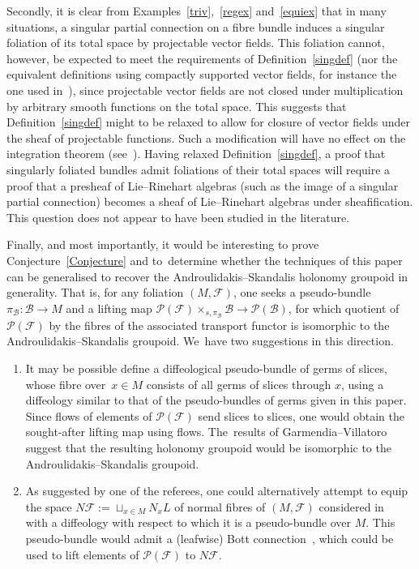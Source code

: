\documentclass[pdftex]{sigma}
\numberwithin{equation}{section}
\def\FF{{\mathcal{F}}}
\def\BB{{\mathcal{B}}}
\def\PP{{\mathcal{P}}}
\begin{document}
Secondly, it is clear from Examples~\ref{triv},~\ref{regex} and~\ref{equiex} that in many situations, a singular partial connection on a fibre bundle induces a singular foliation of its total space by projectable vector fields. This foliation cannot, however, be expected to meet the requirements of Definition~\ref{singdef} (nor the equivalent definitions using compactly supported vector fields, for instance the one used in~\cite{iakovos2}), since projectable vector fields are not closed under multiplication by arbitrary smooth functions on the total space. This suggests that Definition~\ref{singdef} might to be relaxed to allow for closure of vector fields under the sheaf of projectable functions. Such a modification will have no effect on the integration theorem (see~\cite[Theorem~4.2(e)]{sussmann}). Having relaxed Definition~\ref{singdef}, a proof that singularly foliated bundles admit foliations of their total spaces will require a proof that a presheaf of Lie--Rinehart algebras (such as the image of a singular partial connection) becomes a sheaf of Lie--Rinehart algebras under sheafification. This question does not appear to have been studied in the literature.

Finally, and most importantly, it would be interesting to prove Conjecture~\ref{Conjecture} and to~deter\-mine whether the techniques of this paper can be generalised to recover the Androulidakis--Skandalis holonomy groupoid in generality. That is, for any foliation $(M,\FF)$, one seeks a pseudo-bundle $\pi_{\BB}\colon \BB\rightarrow M$ and a lifting map $\PP(\FF)\times_{s,\pi_{\BB}}\BB\rightarrow\PP(\BB)$, for which quotient of $\PP(\FF)$ by the fibres of the associated transport functor is isomorphic to the Androulidakis--Skandalis groupoid. We~have two suggestions in this direction.
\begin{enumerate}\itemsep=0pt
\item It may be possible define a diffeological pseudo-bundle of germs of slices, whose fibre over~$x\in M$ consists of all germs of slices through $x$, using a diffeology similar to that of the pseudo-bundles of germs given in this paper. Since flows of elements of $\PP(\FF)$ send slices to slices, one would obtain the sought-after lifting map using flows. The~results of Garmendia--Villatoro~\cite{VilGar1} suggest that the resulting holonomy groupoid would be isomorphic to the Androulidakis--Skandalis groupoid.
\item As suggested by one of the referees, one could alternatively attempt to equip the space $N\FF:=\sqcup_{x\in M}N_{x}L$ of normal fibres of $(M,\FF)$ considered in~\cite{iakovos4} with a diffeology with respect to which it is a pseudo-bundle over $M$. This pseudo-bundle would admit a (leafwise) Bott connection~\cite[p.~374]{iakovos4}, which could be used to lift elements of $\PP(\FF)$ to $N\FF$.
\end{enumerate}
\end{document}
